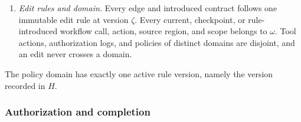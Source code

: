 \begin{definition}
\begin{enumerate}[leftmargin=*,itemsep=0pt,topsep=1pt]
Every current leaf \(b{:}\mathcal C\) equals its immutable registered contract \(\Gamma_b\) after removing the workflow calls recorded in \(\chi_b\); the caller cannot replace it with a smaller result set.
Every constructor in \(T\) is defined, so no complete sequence in any subtree can be properly extended into another.
\item \emph{Edit rules and domain.}
Every edge and introduced contract follows one immutable edit rule at version \(\zeta\).
Every current, checkpoint, or rule-introduced workflow call, action, source region, and scope belongs to \(\omega\).
Tool actions, authorization logs, and policies of distinct domains are disjoint, and an edit never crosses a domain.
\end{enumerate}
The policy domain has exactly one active rule version, namely the version recorded in \(H\).
\end{definition}

\subsubsection{Authorization and completion}

